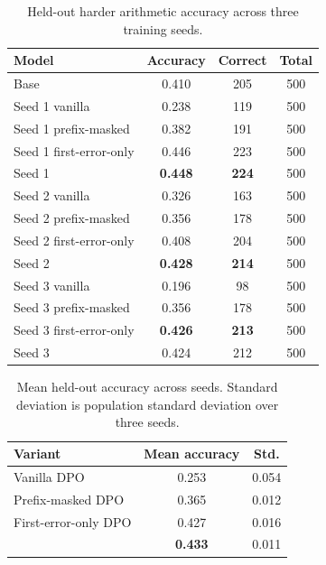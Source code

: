\begin{table}[t]
\caption{Held-out harder arithmetic accuracy across three training seeds.}
\label{tab:multiseed-full}
\begin{center}
\begin{tabular}{lccc}
\toprule
Model & Accuracy & Correct & Total \\
\midrule
Base & 0.410 & 205 & 500 \\
Seed 1 vanilla & 0.238 & 119 & 500 \\
Seed 1 prefix-masked & 0.382 & 191 & 500 \\
Seed 1 first-error-only & 0.446 & 223 & 500 \\
Seed 1 \cmdpo{} & \textbf{0.448} & \textbf{224} & 500 \\
Seed 2 vanilla & 0.326 & 163 & 500 \\
Seed 2 prefix-masked & 0.356 & 178 & 500 \\
Seed 2 first-error-only & 0.408 & 204 & 500 \\
Seed 2 \cmdpo{} & \textbf{0.428} & \textbf{214} & 500 \\
Seed 3 vanilla & 0.196 & 98 & 500 \\
Seed 3 prefix-masked & 0.356 & 178 & 500 \\
Seed 3 first-error-only & \textbf{0.426} & \textbf{213} & 500 \\
Seed 3 \cmdpo{} & 0.424 & 212 & 500 \\
\bottomrule
\end{tabular}
\end{center}
\end{table}

\begin{table}[t]
\caption{Mean held-out accuracy across seeds. Standard deviation is population standard deviation over three seeds.}
\label{tab:multiseed-agg}
\begin{center}
\begin{tabular}{lcc}
\toprule
Variant & Mean accuracy & Std. \\
\midrule
Vanilla DPO & 0.253 & 0.054 \\
Prefix-masked DPO & 0.365 & 0.012 \\
First-error-only DPO & 0.427 & 0.016 \\
\cmdpo{} & \textbf{0.433} & 0.011 \\
\bottomrule
\end{tabular}
\end{center}
\end{table}

